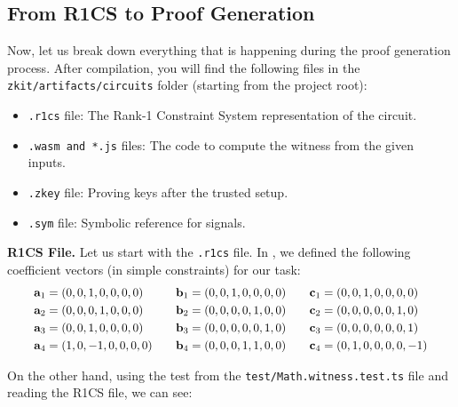 \documentclass[../lecture-notes-148x210.tex]{subfiles}
\begin{document}
\subsection{From R1CS to Proof Generation}

Now, let us break down everything that is happening during the proof
generation process. After compilation, you will find the following files in
the \\
\texttt{zkit/artifacts/circuits} folder (starting from the project root):
\begin{itemize}
    \item \texttt{.r1cs} file: The Rank-1 Constraint System representation of the circuit.
    \item \texttt{.wasm and *.js} files: The code to compute the witness from the given inputs.
    \item \texttt{.zkey} file: Proving keys after the trusted setup.
    \item \texttt{.sym} file: Symbolic reference for signals.
\end{itemize}

\textbf{R1CS File.} Let us start with the \texttt{.r1cs} file. In ,
we defined the following coefficient vectors (in simple constraints) for our
task:
\begin{equation*}
    \scalebox{0.95}{$
    \begin{aligned}
        \mathbf{a}_1 &= (0, 0, 1, 0, 0, 0, 0) & \quad \mathbf{b}_1 &= (0, 0, 1, 0, 0, 0, 0) & \quad \mathbf{c}_1 &= (0, 0, 1, 0, 0, 0, 0) \\
        \mathbf{a}_2 &= (0, 0, 0, 1, 0, 0, 0) & \quad \mathbf{b}_2 &= (0, 0, 0, 0, 1, 0, 0) & \quad \mathbf{c}_2 &= (0, 0, 0, 0, 0, 1, 0) \\
        \mathbf{a}_3 &= (0, 0, 1, 0, 0, 0, 0) & \quad \mathbf{b}_3 &= (0, 0, 0, 0, 0, 1, 0) & \quad \mathbf{c}_3 &= (0, 0, 0, 0, 0, 0, 1) \\
        \mathbf{a}_4 &= (1, 0, -1, 0, 0, 0, 0) & \quad \mathbf{b}_4 &= (0, 0, 0, 1, 1, 0, 0) & \quad \mathbf{c}_4 &= (0, 1, 0, 0, 0, 0, -1)
    \end{aligned}
    $}
\end{equation*}

On the other hand, using the test from the \texttt{test/Math.witness.test.ts} file and reading the R1CS file, we can see:
\end{document}
